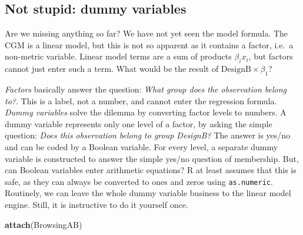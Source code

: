 \documentclass[]{svmono}
\newenvironment{Shaded}{\begin{snugshade}}{\end{snugshade}}
\newcommand{\KeywordTok}[1]{\textcolor[rgb]{0.13,0.29,0.53}{\textbf{#1}}}
\newcommand{\DataTypeTok}[1]{\textcolor[rgb]{0.13,0.29,0.53}{#1}}
\newcommand{\DecValTok}[1]{\textcolor[rgb]{0.00,0.00,0.81}{#1}}
\newcommand{\StringTok}[1]{\textcolor[rgb]{0.31,0.60,0.02}{#1}}
\newcommand{\OperatorTok}[1]{\textcolor[rgb]{0.81,0.36,0.00}{\textbf{#1}}}
\newcommand{\NormalTok}[1]{#1}
\begin{document}
\subsection{Not stupid: dummy variables}\label{dummy_variables}

Are we missing anything so far? We have not yet seen the model formula.
The CGM is a linear model, but this is not so apparent as it contains a
factor, i.e.~a non-metric variable. Linear model terms are a sum of
products \(\beta_ix_i\), but factors cannot just enter such a term. What
would be the result of \(\mathrm{DesignB} \times\beta_1\)?

\emph{Factors} basically answer the question: \emph{What group does the
observation belong to?}. This is a label, not a number, and cannot enter
the regression formula. \emph{Dummy variables} solve the dilemma by
converting factor levels to numbers. A dummy variable represents only
one level of a factor, by asking the simple question: \emph{Does this
observation belong to group DesignB?} The answer is yes/no and can be
coded by a Boolean variable. For every level, a separate dummy variable
is constructed to answer the simple yes/no question of membership. But,
can Boolean variables enter arithmetic equations? R at least assumes
that this is safe, as they can always be converted to ones and zeros
using \texttt{as.numeric}. Routinely, we can leave the whole dummy
variable business to the linear model engine. Still, it is instructive
to do it yourself once.

\begin{Shaded}
\begin{Highlighting}[]
\KeywordTok{attach}\NormalTok{(BrowsingAB)}
\end{Highlighting}
\end{Shaded}

\begin{Shaded}
\end{Shaded}
\end{document}
